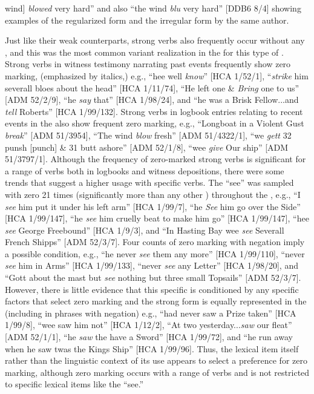 wind] \textit{blowed} very hard” and also “the wind \textit{blu} very hard” [DDB6 8/4] showing examples of the regularized  form and the irregular form by the same author. 

Just like their weak counterparts, strong verbs also frequently occur without any , and this was the most common variant realization in the  for this type of . Strong verbs in witness testimony narrating past events frequently show zero marking, (emphasized by italics,) e.g., “hee well \textit{know}” [HCA 1/52/1], “\textit{strike} him severall bloes about the head” [HCA 1/11/74], “He left one \&  \textit{Bring} one to us” [ADM 52/2/9], “he \textit{say} that” [HCA 1/98/24], and “he was a Brisk Fellow...and \textit{tell} Roberts” [HCA 1/99/132]. Strong verbs in logbook entries relating to recent events in the  also show frequent zero marking, e.g., “Longboat in a Violent Gust \textit{break}” [ADM 51/3954], “The wind \textit{blow} fresh” [ADM 51/4322/1], “we \textit{gett} 32 punsh [punch] \& 31 butt ashore” [ADM 52/1/8], “wee \textit{give} Our ship” [ADM 51/3797/1]. Although the frequency of zero-marked  strong verbs is significant for a range of verbs both in logbooks and witness depositions, there were some trends that suggest a higher usage with specific verbs. The  “see” was sampled with zero  21 times (significantly more than any other ) throughout the , e.g., “I \textit{see} him put it under his left arm” [HCA 1/99/7], “he \textit{See} him go over the Side” [HCA 1/99/147], “he \textit{see} him cruelly beat to make him go” [HCA 1/99/147], “hee \textit{see} George Freebound” [HCA 1/9/3], and “In Hasting Bay wee \textit{see} Severall French Shipps” [ADM 52/3/7]. Four counts of zero marking with negation imply a possible condition, e.g., “he never \textit{see} them any more” [HCA 1/99/110], “never \textit{see} him in Arms” [HCA 1/99/133], “never \textit{see} any Letter” [HCA 1/98/20], and “Gott about the mast but \textit{see} nothing but three small Topsails” [ADM 52/3/7]. However, there is little evidence that this specific  is conditioned by any specific factors that select zero  marking and the strong  form is equally represented in the  (including in phrases with negation) e.g., “had never saw a Prize taken” [HCA 1/99/8], “wee saw him not” [HCA 1/12/2], “At two yesterday...\textit{saw} our fleat” [ADM 52/1/1], “he \textit{saw} the  have a Sword” [HCA 1/99/72], and “he run away when he saw twas the Kings Ship” [HCA 1/99/96]. Thus, the lexical item itself rather than the linguistic context of its use appears to select a preference for zero marking, although zero marking occurs with a range of verbs and is not restricted to specific lexical items like the  “see.”

